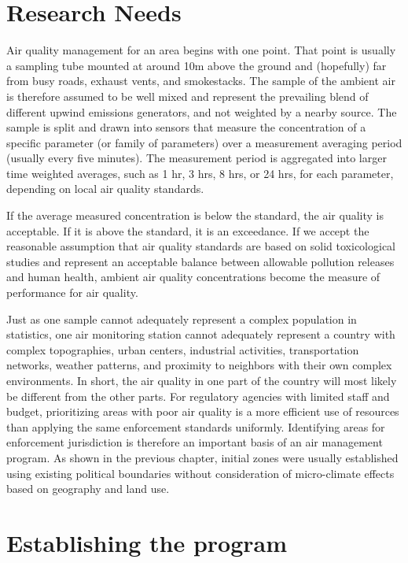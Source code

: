 \section{Research Needs}

Air quality management for an area begins with one point. That point is usually a sampling tube mounted at around 10m above the ground and (hopefully) far from busy roads, exhaust vents, and smokestacks. The sample of the ambient air is therefore assumed to be well mixed and represent the prevailing blend of different upwind emissions generators, and not weighted by a nearby source. The sample is split and drawn into sensors that measure the concentration of a specific parameter (or family of parameters) over a measurement averaging period (usually every five minutes). The measurement period is aggregated into larger time weighted averages, such as 1 hr, 3 hrs, 8 hrs, or 24 hrs, for each parameter, depending on local air quality standards. 

If the average measured concentration is below the standard, the air quality is acceptable. If it is above the standard, it is an exceedance. If we accept the reasonable assumption that air quality standards are based on solid toxicological studies and represent an acceptable balance between allowable pollution releases and human health, ambient air quality concentrations become the measure of performance for air quality.

Just as one sample cannot adequately represent a complex population in statistics, one air monitoring station cannot adequately represent a country with complex topographies, urban centers, industrial activities, transportation networks, weather patterns, and proximity to neighbors with their own complex environments.  In short, the air quality in one part of the country will most likely be different from the other parts. For regulatory agencies with limited staff and budget, prioritizing areas with poor air quality is a more efficient use of resources than applying the same enforcement standards uniformly. Identifying areas for enforcement jurisdiction is therefore an important basis of an air management program. As shown in the previous chapter, initial zones were usually established using existing political boundaries without consideration of micro-climate effects based on geography and land use.  

\section{Establishing the program}
